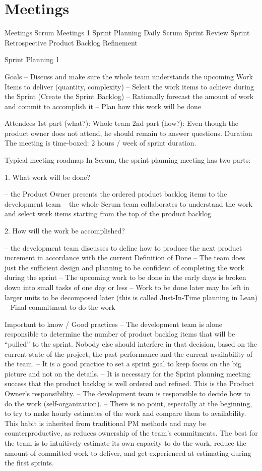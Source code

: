 \section{Meetings}

Meetings
Scrum Meetings 1
Sprint Planning
Daily Scrum
Sprint Review
Sprint Retrospective
Product Backlog Refinement


Sprint Planning 1


Goals
– Discuss and make sure the whole team understands the upcoming Work Items to deliver (quantity, complexity) – Select the work items to achieve during the Sprint (Create the Sprint Backlog) – Rationally forecast the amount of work and commit to accomplish it – Plan how this work will be done

Attendees
1st part (what?): Whole team
2nd part (how?): Even though the product owner does not attend, he should remain to answer questions.
Duration
The meeting is time-boxed: 2 hours / week of sprint duration.

Typical meeting roadmap
In Scrum, the sprint planning meeting has two parts:

1. What work will be done?

– the Product Owner presents the ordered product backlog items to the development team – the whole Scrum team collaborates to understand the work and select work items starting from the top of the product backlog

2. How will the work be accomplished?

– the development team discusses to define how to produce the next product increment in accordance with the current Definition of Done – The team does just the sufficient design and planning to be confident of completing the work during the sprint – The upcoming work to be done in the early days is broken down into small tasks of one day or less – Work to be done later may be left in larger units to be decomposed later (this is called Just-In-Time planning in Lean) – Final commitment to do the work

Important to know / Good practices
– The development team is alone responsible to determine the number of product backlog items that will be “pulled” to the sprint. Nobody else should interfere in that decision, based on the current state of the project, the past performance and the current availability of the team. – It is a good practice to set a sprint goal to keep focus on the big picture and not on the details. – It is necessary for the Sprint planning meeting success that the product backlog is well ordered and refined. This is the Product Owner’s responsibility. – The development team is responsible to decide how to do the work (self-organization). – There is no point, especially at the beginning, to try to make hourly estimates of the work and compare them to availability. This habit is inherited from traditional PM methods and may be counterproductive, as reduces ownership of the team’s commitments. The best for the team is to intuitively estimate its own capacity to do the work, reduce the amount of committed work to deliver, and get experienced at estimating during the first sprints.

